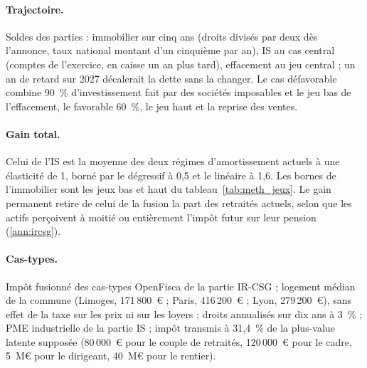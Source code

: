 \documentclass[11pt,a4paper]{article}
\begin{document}
\paragraph{Trajectoire.} Soldes des parties : immobilier sur cinq ans (droits divisés par deux dès l'annonce, taux
national montant d'un cinquième par an), IS au cas central (comptes de l'exercice, en caisse un an plus tard),
effacement au jeu central ; un an de retard sur 2027 décalerait la dette sans la changer. Le cas défavorable combine
90~\% d'investissement fait par des sociétés imposables et le jeu bas de l'effacement, le favorable 60~\%, le jeu haut
et la reprise des ventes.

\paragraph{Gain total.} Celui de l'IS est la moyenne des deux régimes d'amortissement actuels à une élasticité de 1,
borné par le dégressif à 0,5 et le linéaire à 1,6. Les bornes de l'immobilier sont les jeux bas et haut du
tableau~\ref{tab:meth_jeux}. Le gain permanent retire de celui de la fusion la part des retraités actuels, selon que
les actifs perçoivent à moitié ou entièrement l'impôt futur sur leur pension (\ref{ann:ircsg}).

\paragraph{Cas-types.} Impôt fusionné des cas-types OpenFisca de la partie IR-CSG ; logement médian de la commune
(Limoges, 171\,800~€ ; Paris, 416\,200~€ ; Lyon, 279\,200~€), sans effet de la taxe sur les prix ni sur les loyers ;
droits annualisés sur dix ans à 3~\% ; PME industrielle de la partie IS ; impôt transmis à 31,4~\% de la plus-value
latente supposée (80\,000~€ pour le couple de retraités, 120\,000~€ pour le cadre, 5~M€ pour le dirigeant, 40~M€ pour
le rentier).
\end{document}
